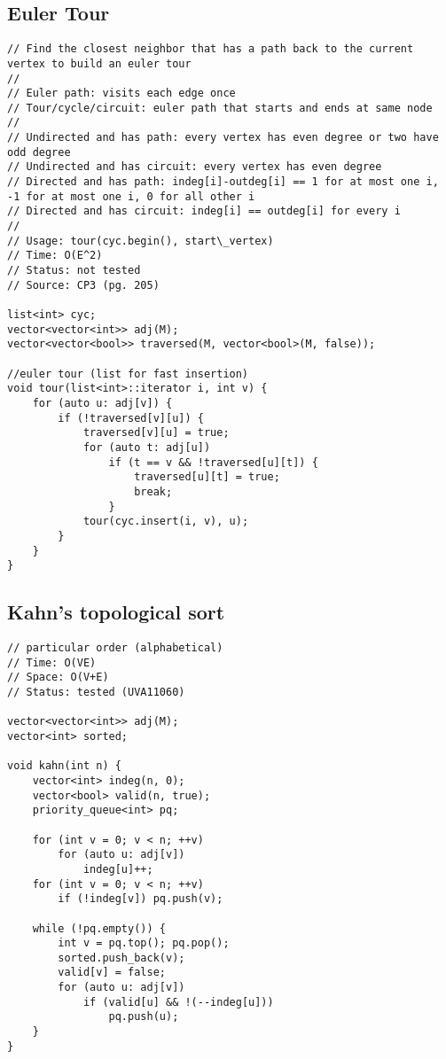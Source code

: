 \documentclass[12pt, a4paper, twoside]{article}
\begin{document}
\subsection{Euler Tour}
\begin{lstlisting}
// Find the closest neighbor that has a path back to the current vertex to build an euler tour
//
// Euler path: visits each edge once
// Tour/cycle/circuit: euler path that starts and ends at same node
//
// Undirected and has path: every vertex has even degree or two have odd degree
// Undirected and has circuit: every vertex has even degree
// Directed and has path: indeg[i]-outdeg[i] == 1 for at most one i, -1 for at most one i, 0 for all other i
// Directed and has circuit: indeg[i] == outdeg[i] for every i
//
// Usage: tour(cyc.begin(), start\_vertex)
// Time: O(E^2)
// Status: not tested
// Source: CP3 (pg. 205)

list<int> cyc;
vector<vector<int>> adj(M);
vector<vector<bool>> traversed(M, vector<bool>(M, false));

//euler tour (list for fast insertion)
void tour(list<int>::iterator i, int v) {
	for (auto u: adj[v]) {
		if (!traversed[v][u]) {
			traversed[v][u] = true;
			for (auto t: adj[u])
				if (t == v && !traversed[u][t]) {
					traversed[u][t] = true;
					break;
				}
			tour(cyc.insert(i, v), u);
		}
	}
}
\end{lstlisting}

\subsection{Kahn's topological sort}
\begin{lstlisting}
// particular order (alphabetical)
// Time: O(VE)
// Space: O(V+E)
// Status: tested (UVA11060)

vector<vector<int>> adj(M);
vector<int> sorted;

void kahn(int n) {
	vector<int> indeg(n, 0);
	vector<bool> valid(n, true);
	priority_queue<int> pq;

	for (int v = 0; v < n; ++v)
		for (auto u: adj[v])
			indeg[u]++;
	for (int v = 0; v < n; ++v)
		if (!indeg[v]) pq.push(v);

	while (!pq.empty()) {
		int v = pq.top(); pq.pop();
		sorted.push_back(v);
		valid[v] = false;
		for (auto u: adj[v])
			if (valid[u] && !(--indeg[u]))
				pq.push(u);
	}
}
\end{lstlisting}
\end{document}
